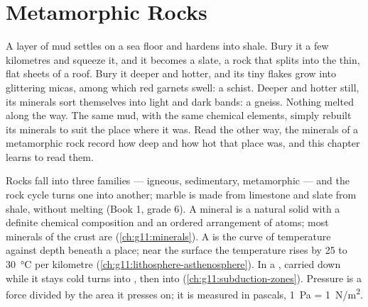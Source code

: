 \chapter{Metamorphic Rocks}\label{ch:g12:metamorphic-rocks}

A layer of mud settles on a sea floor and hardens into shale. Bury it a few
kilometres and squeeze it, and it becomes a slate, a rock that splits into
the thin, flat sheets of a roof. Bury it deeper and hotter, and its tiny
flakes grow into glittering micas, among which red garnets swell: a schist.
Deeper and hotter still, its minerals sort themselves into light and dark
bands: a gneiss. Nothing melted along the way. The same mud, with the same
chemical elements, simply rebuilt its minerals to suit the place where it
was. Read the other way, the minerals of a metamorphic rock record how deep
and how hot that place was, and this chapter learns to read them.

\begin{recall}
Rocks fall into three families --- igneous, sedimentary, metamorphic --- and
the rock cycle turns one into another; marble is made from limestone and
slate from shale, without melting (Book 1, grade 6). A mineral is a natural
solid with a definite chemical composition and an ordered arrangement of
atoms; most minerals of the crust are 
(\cref{ch:g11:minerals}). A  is the curve of temperature against
depth beneath a place; near the surface the temperature rises by 25 to
\qty{30}{\celsius} per kilometre (\cref{ch:g11:lithosphere-asthenosphere}).
In a ,  carried down while it stays cold turns
into , then into  (\cref{ch:g11:subduction-zones}).
Pressure is a force divided by the area it presses on; it is measured in
pascals, \qty{1}{Pa} = \qty{1}{N/m^2}.
\end{recall}

